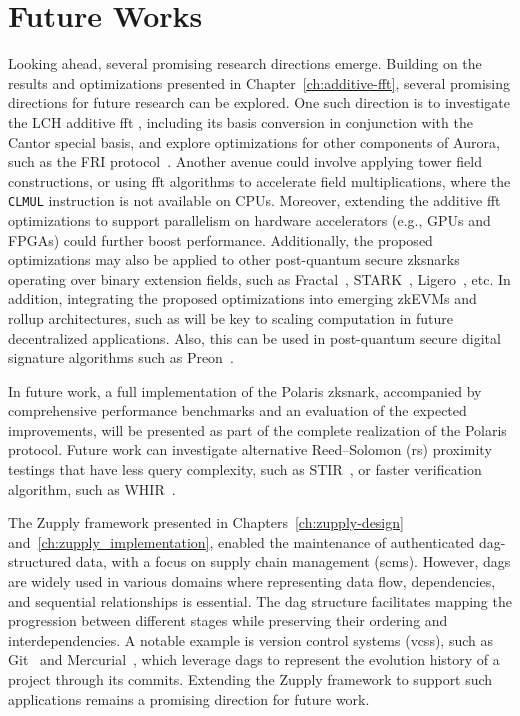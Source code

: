 \section{Future Works}

Looking ahead, several promising research directions emerge.  Building on the results and optimizations presented in Chapter~\ref{ch:additive-fft}, several promising directions for future research can be explored. One such direction is to investigate the LCH additive \gls{fft} \cite{LCH-FFT2016}, including its basis conversion in conjunction with the Cantor special basis, and explore optimizations for other components of Aurora, such as the FRI protocol~\cite{FRI2018}. Another avenue could involve applying tower field constructions, or using  \gls{fft} algorithms to accelerate field multiplications, where the \texttt{CLMUL} instruction is not available on CPUs. Moreover, extending the additive \gls{fft} optimizations to support parallelism on hardware accelerators (e.g., GPUs and FPGAs) could further boost performance. Additionally, the proposed optimizations may also be applied to other post-quantum secure \glspl{zksnark} operating over binary extension fields, such as Fractal~\cite{Chiesa2020Fractal}, STARK~\cite{Ben-Sasson2018STARK}, Ligero~\cite{Ames2017Ligero}, etc. In addition, integrating the proposed optimizations into emerging zkEVMs and rollup architectures, such as \cite{STARKnet, PolygonZKEVM, zkSync} will be key to scaling computation in future decentralized applications. Also, this can be used in post-quantum secure digital signature algorithms such as Preon~\cite{Preon2023}.

	
In future work, a full implementation of the Polaris \gls{zksnark}, accompanied by comprehensive performance benchmarks and an evaluation of the expected improvements, will be presented as part of the complete realization of the Polaris protocol. Future work can investigate alternative Reed–Solomon (\gls{rs}) proximity testings that have less query complexity, such as STIR~\cite{Arnon2024STIR}, or faster verification algorithm, such as WHIR~\cite{Arnon2024WHIR}.

The Zupply framework presented in Chapters~\ref{ch:zupply-design} and~\ref{ch:zupply_implementation}, enabled the maintenance of authenticated \gls{dag}-structured data, with a focus on supply chain management (\glspl{scm}). However, \glspl{dag} are widely used in various domains where representing data flow, dependencies, and sequential relationships is essential. The \gls{dag} structure facilitates mapping the progression between different stages while preserving their ordering and interdependencies. A notable example is version control systems (\glspl{vcs}), such as Git~\cite{gitonline2023} and Mercurial~\cite{mercurial}, which leverage \glspl{dag} to represent the evolution history of a project through its commits. Extending the Zupply framework to support such applications remains a promising direction for future work.
	
